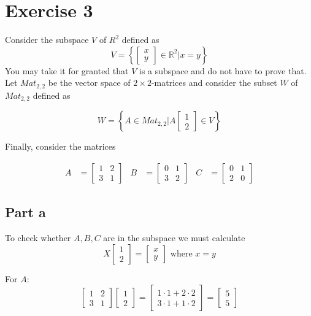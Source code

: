 \section{Exercise 3}
Consider the subspace $V$ of $R^2$ defined as
\[
	V = \left\{\begin{bmatrix}x\\y\end{bmatrix} \in \mathbb{R}^2 \bigg| x = y\right\}
\]
You may take it for granted that $V$ is a subspace and do not have to prove that. Let $Mat_{2,2}$ be the vector space of $2 \times 2$-matrices and consider the subset $W$ of $Mat_{2,2}$ defined as

\[
	W = \left\{A\in Mat_{2,2} \bigg| A\begin{bmatrix}1\\2\end{bmatrix}\in V\right\}
\]

Finally, consider the matrices

\begin{align*}
	A & = \begin{bmatrix}
		      1 & 2 \\
		      3 & 1
	      \end{bmatrix} &
	B & = \begin{bmatrix}
		      0 & 1 \\
		      3 & 2
	      \end{bmatrix} &
	C & = \begin{bmatrix}
		      0 & 1 \\
		      2 & 0
	      \end{bmatrix}
\end{align*}

\subsection{Part a}

To check whether $A,B,C$ are in the subspace we must calculate
\[
	X\begin{bmatrix}
		1 \\
		2
	\end{bmatrix} = \begin{bmatrix}
		x \\
		y
	\end{bmatrix} \text{ where } x = y
\]

For $A$:
\[
	\begin{bmatrix}
		1 & 2 \\
		3 & 1
	\end{bmatrix}\begin{bmatrix}
		1 \\
		2
	\end{bmatrix} =
	\begin{bmatrix}
		1\cdot 1 + 2\cdot 2 \\
		3\cdot 1 + 1\cdot 2
	\end{bmatrix} =
	\begin{bmatrix}
		5 \\
		5
	\end{bmatrix}
\]

